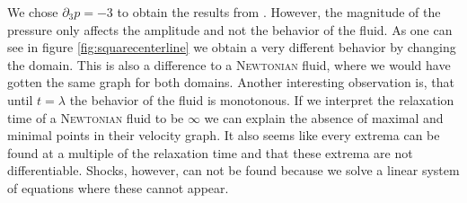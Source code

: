 \documentclass[12pt,a4paper,twoside, open=right]{scrreprt}
\theoremstyle{definition}
\theoremstyle{plain}
\begin{document}
We chose $\partial_3 p=-3$ to obtain the results from \cite{A.S.RDuarte2008}. However, the magnitude of the pressure only affects the amplitude and not the behavior of the fluid. As one can see in figure \ref{fig:squarecenterline} we obtain a very different behavior by changing the domain. This is also a difference to a \textsc{Newtonian} fluid, where we would have gotten the same graph for both domains. Another interesting observation is, that until $t=\lambda$ the behavior of the fluid is monotonous. If we interpret the relaxation time of a \textsc{Newtonian} fluid to be $\infty$ we can explain the absence of maximal and minimal points in their velocity graph. It also seems like every extrema can be found at a multiple of the relaxation time and that these extrema are not differentiable. Shocks, however, can not be found because we solve a linear system of equations where these cannot appear.
\end{document}
